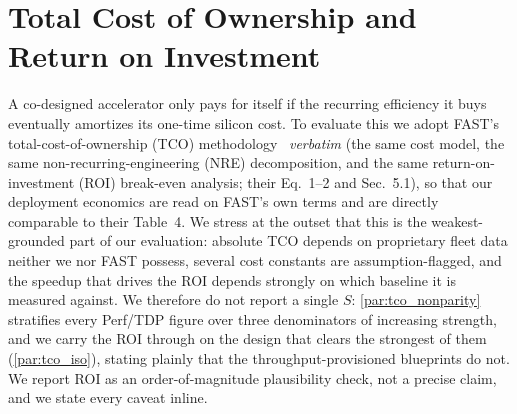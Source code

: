 \section{Total Cost of Ownership and Return on Investment}
\label{sec:tco}
\providecommand{\Vtwo}{\textcolor{skyblue}{V2}}

A co-designed accelerator only pays for itself if the recurring efficiency it
buys eventually amortizes its one-time silicon cost. To evaluate this we adopt
FAST's total-cost-of-ownership (TCO) methodology~\citep{zhang_fast}
\emph{verbatim} (the same cost model, the same non-recurring-engineering (NRE)
decomposition, and the same return-on-investment (ROI) break-even analysis;
their Eq.~1--2 and Sec.~5.1), so that our deployment economics are read on
FAST's own terms and are directly comparable to their Table~4. We stress at the
outset that this is the weakest-grounded part of our evaluation: absolute TCO
depends on proprietary fleet data neither we nor FAST possess, several cost
constants are assumption-flagged, and the speedup that drives the ROI depends
strongly on which baseline it is measured against. We therefore do not report a
single $S$: \cref{par:tco_nonparity} stratifies every Perf/TDP figure over three
denominators of increasing strength, and we carry the ROI through on the design
that clears the strongest of them (\cref{par:tco_iso}), stating plainly that the
throughput-provisioned blueprints do not. We report ROI as an order-of-magnitude
plausibility check, not a precise claim, and we state every caveat inline.

